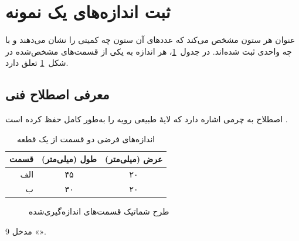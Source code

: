 \documentclass[12pt,a4paper]{article}
\begin{document}
\tableofcontents
\clearpage

\section{ثبت اندازه‌های یک نمونه}
عنوان هر ستون مشخص می‌کند که عددهای آن ستون چه کمیتی را نشان می‌دهند و با چه واحدی ثبت شده‌اند. در جدول~\ref{tab:measurements}، هر اندازه به یکی از قسمت‌های مشخص‌شده در شکل~\ref{fig:parts} تعلق دارد.

\subsection{معرفی اصطلاح فنی}
اصطلاح  به چرمی اشاره دارد که لایۀ طبیعی رویه را به‌طور کامل حفظ کرده است \cite{lwg}.

\begin{table}[htbp]
  \centering
  \caption{اندازه‌های فرضی دو قسمت از یک قطعه}
  \label{tab:measurements}
  \begin{tabular}{rcc}
    \toprule
    قسمت & طول (میلی‌متر) & عرض (میلی‌متر) \\
    \midrule
    الف & ۴۵ & ۲۰ \\
    ب   & ۳۰ & ۲۰ \\
    \bottomrule
  \end{tabular}
\end{table}

\begin{figure}[htbp]
  \centering
  \setlength{\fboxsep}{0pt}
  \setlength{\fboxrule}{0.6pt}
  \hspace{3mm}%
  \caption{طرح شماتیک قسمت‌های اندازه‌گیری‌شده}
  \label{fig:parts}
\end{figure}

\begin{thebibliography}{9}
  \newline
  مدخل «\mbox{}».
\end{thebibliography}
\end{document}

